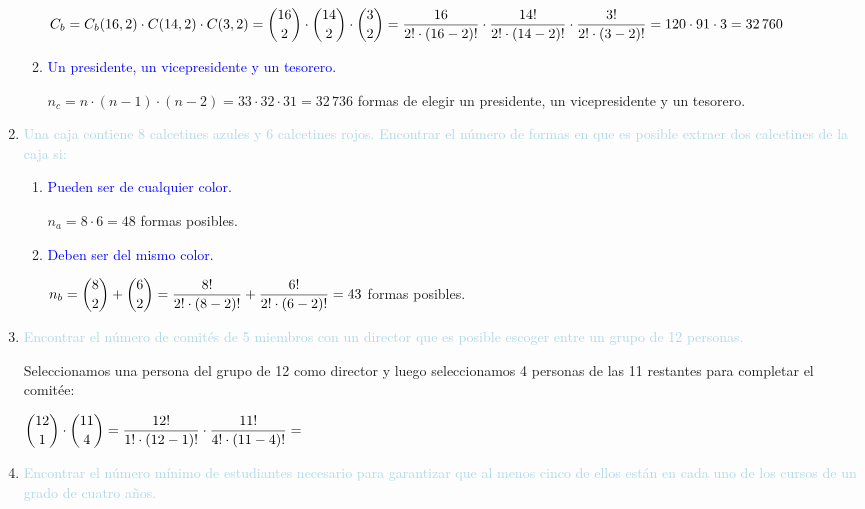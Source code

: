\documentclass[12pt]{article}
\newcommand{\lb}[1]{\textcolor{lightblue}{#1}}
\newcommand{\db}[1]{\textcolor{blue}{#1}}
\newcommand{\rbinom}[2]{\dfrac{#1!}{#2!\cdot(#1-#2)!}}
\begin{document}
\begin{enumerate}[label=\color{red}\textbf{\arabic*)}, leftmargin=*]
\begin{enumerate}[label=\color{red}\alph*)]
        $C_b=C_b(16,2) \cdot C(14,2)\cdot C(3,2)=\dbinom{16}{2}\cdot\dbinom{14}{2}\cdot\dbinom{3}{2}=\dfrac{16}{2!\cdot(16-2)!}\cdot\dfrac{14!}{2!\cdot(14-2)!}\cdot\dfrac{3!}{2!\cdot(3-2)!}=120\cdot91\cdot3=32\,760$
        \item \db{Un presidente, un vicepresidente y un tesorero.}
        
        $n_c=n\cdot(n-1)\cdot(n-2)=33\cdot32\cdot31=32\,736$ formas de elegir un presidente, un vicepresidente y un tesorero.
    \end{enumerate}
    \item \lb{Una caja contiene 8 calcetines azules y 6 calcetines rojos. Encontrar el número de formas en que es posible extraer dos calcetines de la caja si:}
    \begin{enumerate}[label=\color{red}\alph*)]
    	\item \db{Pueden ser de cualquier color.}
        
        $n_a=8\cdot6=48$ formas posibles.
        \item \db{Deben ser  del mismo color.}
        
        $n_b=\dbinom{8}{2}+\dbinom{6}{2}=\dfrac{8!}{2!\cdot(8-2)!}+\dfrac{6!}{2!\cdot(6-2)!}=43$ formas posibles.
    \end{enumerate}
    \item \lb{Encontrar el número de comités de 5 miembros con un director que es posible escoger entre un grupo de 12 personas.}
    
    Seleccionamos una persona del grupo de 12 como director y luego seleccionamos 4 personas de las 11 restantes para completar el comitée:
    
    $\dbinom{12}{1}\cdot\dbinom{11}{4}=\dfrac{12!}{1!\cdot(12-1)!}\cdot\rbinom{11}{4}=$
    \item \lb{Encontrar el número mínimo de estudiantes necesario para garantizar que al menos cinco de ellos están en cada uno de los cursos de un grado de cuatro años.}
\end{enumerate}
\end{document}
